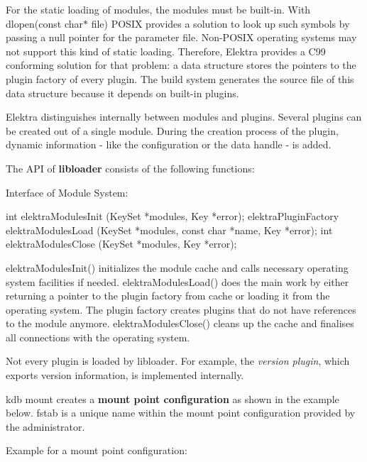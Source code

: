 For the static loading of modules, the modules must be built-\/in. With {\ttfamily dlopen(const char$\ast$ file)} P\+O\+S\+IX provides a solution to look up such symbols by passing a null pointer for the parameter {\ttfamily file}. Non-\/\+P\+O\+S\+IX operating systems may not support this kind of static loading. Therefore, Elektra provides a C99 conforming solution for that problem\+: a data structure stores the pointers to the plugin factory of every plugin. The build system generates the source file of this data structure because it depends on built-\/in plugins.

Elektra distinguishes internally between modules and plugins. Several plugins can be created out of a single module. During the creation process of the plugin, dynamic information -\/ like the configuration or the data handle -\/ is added.

The A\+PI of {\bfseries libloader} consists of the following functions\+:

Interface of Module System\+:


\begin{DoxyCode}
\textcolor{keywordtype}{int} elektraModulesInit (KeySet *modules, Key *error);
elektraPluginFactory elektraModulesLoad (KeySet *modules,
                \textcolor{keyword}{const} \textcolor{keywordtype}{char} *name, Key *error);
\textcolor{keywordtype}{int} elektraModulesClose (KeySet *modules, Key *error);
\end{DoxyCode}


{\ttfamily elektra\+Modules\+Init()} initializes the module cache and calls necessary operating system facilities if needed. {\ttfamily elektra\+Modules\+Load()} does the main work by either returning a pointer to the plugin factory from cache or loading it from the operating system. The plugin factory creates plugins that do not have references to the module anymore. {\ttfamily elektra\+Modules\+Close()} cleans up the cache and finalises all connections with the operating system.

Not every plugin is loaded by {\ttfamily libloader}. For example, the {\itshape version plugin}, which exports version information, is implemented internally.

{\ttfamily kdb mount} creates a {\bfseries mount point configuration} as shown in the example below. {\ttfamily fstab} is a unique name within the mount point configuration provided by the administrator.

Example for a mount point configuration\+:


